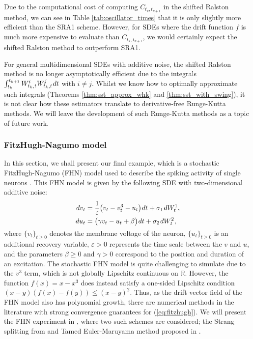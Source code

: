 \documentclass[sn-mathphys-num]{sn-jnl}%
\newcommand{\R}{\mathbb{R}}
\newcommand{\m}{\hspace{0.25mm}}
\begin{document}
Due to the computational cost of computing $C_{t_k,t_{k+1}}$ in the shifted Ralston method, we can see in Table \ref{tab:oscillator_times} that it is only slightly more efficient than the SRA1 scheme.
However, for SDEs where the drift function $f$ is much more expensive to evaluate than $C_{t_k,t_{k+1}}$, we would certainly expect the shifted Ralston method to outperform SRA1.\medbreak

For general multidimensional SDEs with additive noise, the shifted Ralston method is no longer asymptotically efficient due to the integrals $\int_{t_k}^{t_{k+1}} W_{t_k, t}^i W_{t_k, t}^j\m dt$ with $i\neq j$.\vspace{0.5mm}
Whilst we know how to optimally approximate such integrals (Theorems \ref{thm:sst_approx_whk} and \ref{thm:sst_with_swing}),
it is not clear how these estimators translate to derivative-free Runge-Kutta methods.
We will leave the development of such Runge-Kutta methods as a topic of future work.

\subsubsection{FitzHugh-Nagumo model}

In this section, we shall present our final example, which is a stochastic FitzHugh-Nagumo (FHN) model used to describe the spiking activity of single neurons \cite{buckwar2022splitting, leon2018fitzhugh}. This FHN model is given by the following SDE with two-dimensional additive noise:\vspace{-1mm}
\begin{align}\label{eq:fitzhugh}
dv_t & = \frac{1}{\varepsilon}\big(v_t - v_t^3 - u_t\big)\m dt + \sigma_1\m dW_t^1,\\
du_t & = \big(\gamma v_t - u_t + \beta\big)\m dt + \sigma_2\m dW_t^2,\nonumber\\[-18pt]\nonumber
\end{align}
where $\{v_t\}_{t\geq 0}$ denotes the membrane voltage of the neuron, $\{u_t\}_{t\geq 0}$ is an additional recovery variable, $\varepsilon > 0$ represents the time scale between the $v$ and $u$, and the parameters $\beta\geq 0$ and $\gamma > 0$ correspond to the position and duration of an excitation.\medbreak
The stochastic FHN model is quite challenging to simulate due to the $v^3$ term, which is not globally Lipschitz continuous on $\R$. However, the function $f(x) = x - x^3$ does instead satisfy a one-sided Lipschitz condition $(x-y)(f(x) - f(y)) \leq (x-y)^2$.\vspace{0.5mm}
Thus, as the drift vector field of the FHN model also has polynomial growth, there are numerical methods in the literature with strong convergence guarantees for (\ref{eq:fitzhugh}). We will present the FHN experiment in \cite{foster2024splitting}, where two such schemes are considered; the Strang splitting from \cite{buckwar2022splitting} and Tamed Euler-Maruyama method proposed in \cite{hutzenthaler2012}.\medbreak
\end{document}
